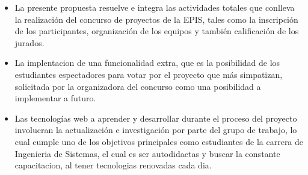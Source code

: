 \documentclass[%
 reprint,
 amsmath,amssymb,
 aps,
]{revtex4-1}
\begin{document}
\begin{itemize}
\item La presente propuesta resuelve e integra las actividades totales que conlleva la realización del concurso de proyectos de la EPIS, tales como la inscripción de los participantes, organización de los equipos y también calificación de los jurados. 

\item La implentacion de una funcionalidad extra, que es la posibilidad de los estudiantes espectadores  para votar por el proyecto que más simpatizan,  solicitada por la organizadora del concurso como una posibilidad a implementar a futuro. 

\item Las tecnologías web a aprender y desarrollar durante el proceso del proyecto involucran la actualización e investigación por parte del grupo de trabajo, lo cual cumple uno de los objetivos principales como estudiantes de la carrera de Ingenieria de Sistemas, el cual es ser autodidactas y buscar la constante capacitacion, al tener tecnologias renovadas cada dia.
 

\end{itemize}


%
%
\end{document}
